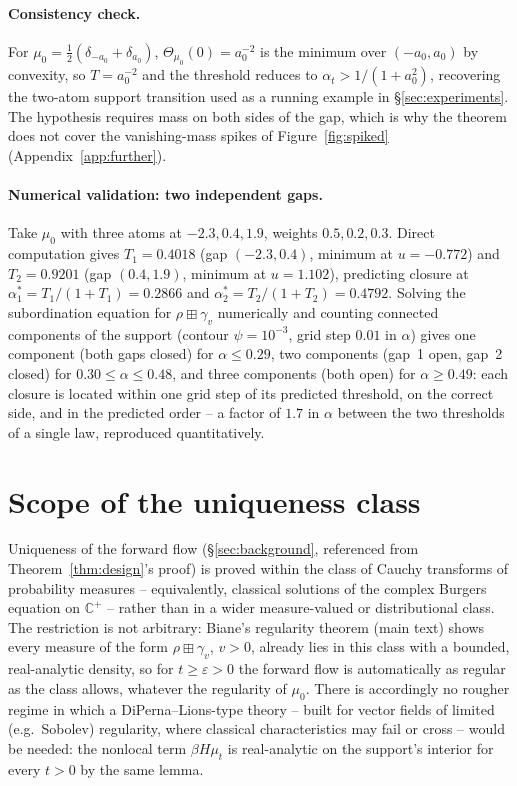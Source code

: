 \documentclass[11pt]{article}
\theoremstyle{plain}
\theoremstyle{definition}
\theoremstyle{remark}
\begin{document}
\paragraph{Consistency check.} For $\mu_0=\tfrac12(\delta_{-a_0}+\delta_{a_0})$,
$\Theta_{\mu_0}(0)=a_0^{-2}$ is the minimum over $(-a_0,a_0)$ by convexity, so
$T=a_0^{-2}$ and the threshold reduces to $\alpha_t>1/(1+a_0^2)$, recovering the
two-atom support transition used as a running example in \S\ref{sec:experiments}.
The hypothesis requires mass on both sides of the gap, which is why the theorem does
not cover the vanishing-mass spikes of Figure~\ref{fig:spiked} (Appendix~\ref{app:further}).

\paragraph{Numerical validation: two independent gaps.} Take $\mu_0$ with three
atoms at $-2.3,0.4,1.9$, weights $0.5,0.2,0.3$. Direct computation gives
$T_1=0.4018$ (gap $(-2.3,0.4)$, minimum at $u=-0.772$) and $T_2=0.9201$ (gap
$(0.4,1.9)$, minimum at $u=1.102$), predicting closure at
$\alpha_1^*=T_1/(1+T_1)=0.2866$ and $\alpha_2^*=T_2/(1+T_2)=0.4792$. Solving the
subordination equation for $\rho\boxplus\gamma_v$ numerically and counting connected
components of the support (contour $\psi=10^{-3}$, grid step $0.01$ in $\alpha$)
gives one component (both gaps closed) for $\alpha\le0.29$, two components (gap~1
open, gap~2 closed) for $0.30\le\alpha\le0.48$, and three components (both open) for
$\alpha\ge0.49$: each closure is located within one grid step of its predicted
threshold, on the correct side, and in the predicted order -- a factor of $1.7$ in
$\alpha$ between the two thresholds of a single law, reproduced quantitatively.

\section{Scope of the uniqueness class}\label{app:diperna}

Uniqueness of the forward flow (\S\ref{sec:background}, referenced from
Theorem~\ref{thm:design}'s proof) is proved within the class of Cauchy transforms of
probability measures -- equivalently, classical solutions of the complex Burgers
equation on $\mathbb C^+$ -- rather than in a wider measure-valued or distributional
class. The restriction is not arbitrary: Biane's regularity theorem (main
text) shows every measure of the form $\rho\boxplus\gamma_v$, $v>0$, already lies in
this class with a bounded, real-analytic density, so for $t\ge\varepsilon>0$ the
forward flow is automatically as regular as the class allows, whatever the
regularity of $\mu_0$. There is accordingly no rougher regime in which a
DiPerna--Lions-type theory \citep{DiPernaLions1989} -- built for vector fields of
limited (e.g.\ Sobolev) regularity, where classical characteristics may fail or
cross -- would be needed: the nonlocal term $\beta H\mu_t$ is real-analytic on the
support's interior for every $t>0$ by the same lemma.
\end{document}

